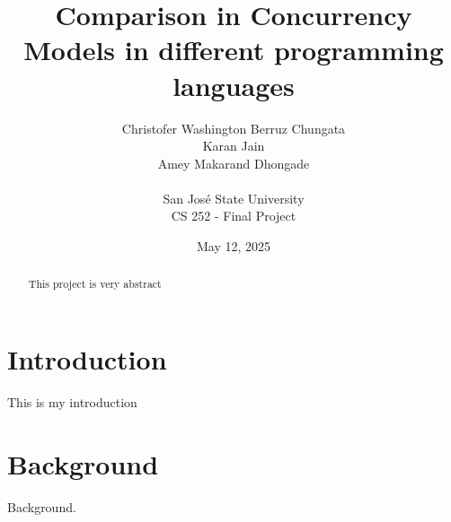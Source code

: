 \documentclass[12pt]{article}
\begin{document}
\title{Comparison in Concurrency Models in different programming languages}
\author{
    Christofer Washington Berruz Chungata \\ 
    Karan Jain \\ 
    Amey Makarand Dhongade \\ 
    \\
    San Jos\'{e} State University \\ 
    CS 252 - Final Project
}
\date{May 12, 2025}

\maketitle

\begin{abstract}
This project is very abstract
\end{abstract}

\section{Introduction\label{sec:introduction}}
This is my introduction

\section{Background\label{sec:background}}
Background.







\end{document}
